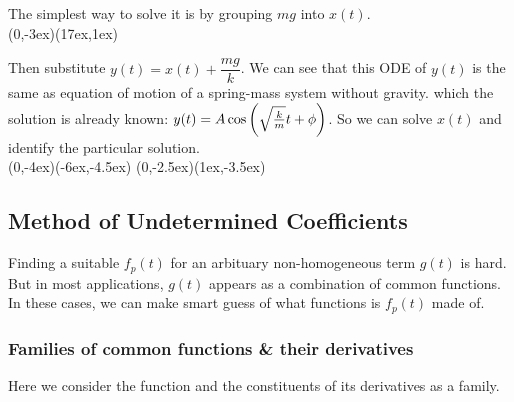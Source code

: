 \documentclass[class=article, crop=false, 12pt]{standalone}
\begin{document}

The simplest way to solve it is by grouping $mg$ into $x(t)$. 
\\
{(0,-3ex)}{(17ex,1ex)}

Then substitute $y(t) = x(t) + \dfrac{mg}{k}$. 
We can see that this ODE of $y(t)$ is the same as equation of motion of a spring-mass system without gravity.
which the solution is already known: $y(t) = A\cos\qty(\sqrt{\frac{k}{m}}t+\phi)$.
So we can solve $x(t)$ and identify the particular solution.
\\[4em]
{(0,-4ex)}{(-6ex,-4.5ex)}
{(0,-2.5ex)}{(1ex,-3.5ex)}


\subsection{Method of Undetermined Coefficients}

Finding a suitable $f_p(t)$ for an arbituary non-homogeneous term $g(t)$ is hard. 
But in most applications, $g(t)$ appears as a combination of common functions.
In these cases, we can make smart guess of what functions is $f_p(t)$ made of.

\subsubsection{Families of common functions \& their derivatives}

Here we consider the function and the constituents of its derivatives as a family.
\end{document}
